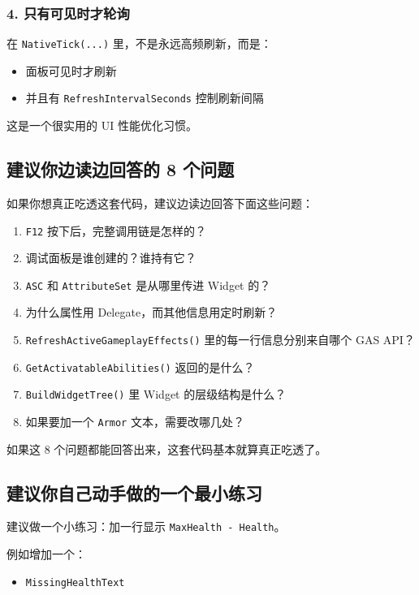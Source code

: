 \subsubsection{4. 只有可见时才轮询}
在 \texttt{NativeTick(...)} 里，不是永远高频刷新，而是：

\begin{itemize}
	\item 面板可见时才刷新
	\item 并且有 \texttt{RefreshIntervalSeconds} 控制刷新间隔
\end{itemize}

这是一个很实用的 UI 性能优化习惯。

\subsection{建议你边读边回答的 8 个问题}
如果你想真正吃透这套代码，建议边读边回答下面这些问题：

\begin{enumerate}
	\item \texttt{F12} 按下后，完整调用链是怎样的？
	\item 调试面板是谁创建的？谁持有它？
	\item \texttt{ASC} 和 \texttt{AttributeSet} 是从哪里传进 Widget 的？
	\item 为什么属性用 Delegate，而其他信息用定时刷新？
	\item \texttt{RefreshActiveGameplayEffects()} 里的每一行信息分别来自哪个 GAS API？
	\item \texttt{GetActivatableAbilities()} 返回的是什么？
	\item \texttt{BuildWidgetTree()} 里 Widget 的层级结构是什么？
	\item 如果要加一个 \texttt{Armor} 文本，需要改哪几处？
\end{enumerate}

如果这 8 个问题都能回答出来，这套代码基本就算真正吃透了。

\subsection{建议你自己动手做的一个最小练习}
建议做一个小练习：加一行显示 \texttt{MaxHealth - Health}。

例如增加一个：

\begin{itemize}
	\item \texttt{MissingHealthText}
\end{itemize}

